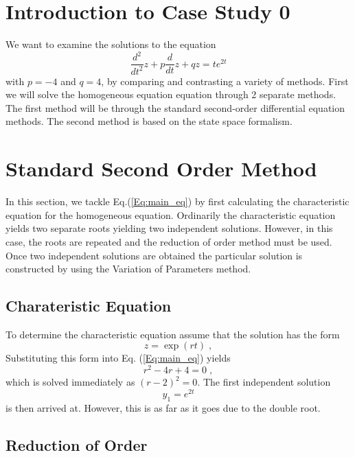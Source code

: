\documentclass[10pt]{article}
\begin{document}
\section{Introduction to Case Study 0}
We want to examine the solutions to the equation 
\begin{equation}\label{Eq:main_eq}
  \frac{d^2}{dt^2} z + p \frac{d}{dt} z + q z = t e^{2 t}
\end{equation}
with $p = -4$ and $q = 4$, 
by comparing and contrasting a variety of methods. First we will
solve the homogeneous equation equation through 2 separate methods.  The
first method will be through the standard second-order differential
equation methods.  The second method is based on the state space formalism. 

\section{Standard Second Order Method}
In this section, we tackle Eq.(\ref{Eq:main_eq}) by first calculating 
the characteristic equation for the homogeneous equation.  Ordinarily 
the characteristic equation yields two separate roots yielding two 
independent solutions.  However, in this case, the roots are repeated
and the reduction of order method must be used. Once two independent
solutions are obtained the particular solution is constructed by
using the Variation of Parameters method.

\subsection{Charateristic Equation}
To determine the characteristic equation assume that the solution 
has the form
\[
  z = \exp(r t) \; ,
\]
Substituting this form into Eq. (\ref{Eq:main_eq}) yields
\[
  r^2 - 4 r + 4 = 0 \;,
\]
which is solved immediately as $(r-2)^2 = 0$. The first independent
solution
\[
  y_1 = e^{2t}
\]
is then arrived at. However, this is as far as it goes due to the
double root.  

\subsection{Reduction of Order}
\end{document}
